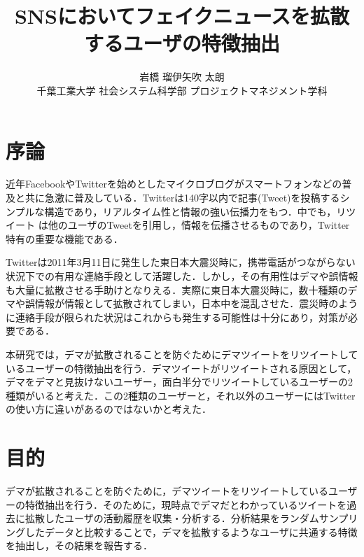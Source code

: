 \documentclass[uplatex,twocolumn]{jsarticle}
\title{\vspace{-10mm}\Large{SNSにおいてフェイクニュースを拡散するユーザの特徴抽出}\footnotemark[0]}%
\author{\large{岩橋 瑠伊\footnotemark[2]\qquad 矢吹 太朗}\\千葉工業大学 社会システム科学部 プロジェクトマネジメント学科\footnotemark[3]}%
\date{}
\begin{document}
\twocolumn[\maketitle]

\begingroup
\def\thefootnote{\fnsymbol{footnote}}
\endgroup

\section{序論}
近年FacebookやTwitterを始めとしたマイクロブログがスマートフォンなどの普及と共に急激に普及している．Twitterは140字以内で記事(Tweet)を投稿するシンプルな構造であり，リアルタイム性と情報の強い伝播力をもつ．中でも，リツイート は他のユーザのTweetを引用し，情報を伝播させるものであり，Twitter特有の重要な機能である\cite{dema1}．

Twitterは2011年3月11日に発生した東日本大震災時に，携帯電話がつながらない状況下での有用な連絡手段として活躍した．しかし，その有用性はデマや誤情報も大量に拡散させる手助けとなりえる．実際に東日本大震災時に，数十種類のデマや誤情報が情報として拡散されてしまい，日本中を混乱させた．震災時のように連絡手段が限られた状況はこれからも発生する可能性は十分にあり，対策が必要である\cite{dema2}．

本研究では，デマが拡散されることを防ぐためにデマツイートをリツイートしているユーザーの特徴抽出を行う．デマツイートがリツイートされる原因として，デマをデマと見抜けないユーザー，面白半分でリツイートしているユーザーの2種類がいると考えた．この2種類のユーザーと，それ以外のユーザーにはTwitterの使い方に違いがあるのではないかと考えた．

\section{目的}
デマが拡散されることを防ぐために，デマツイートをリツイートしているユーザーの特徴抽出を行う．そのために，現時点でデマだとわかっているツイートを過去に拡散したユーザの活動履歴を収集・分析する．分析結果をランダムサンプリングしたデータと比較することで，デマを拡散するようなユーザに共通する特徴を抽出し，その結果を報告する．
\end{document}
